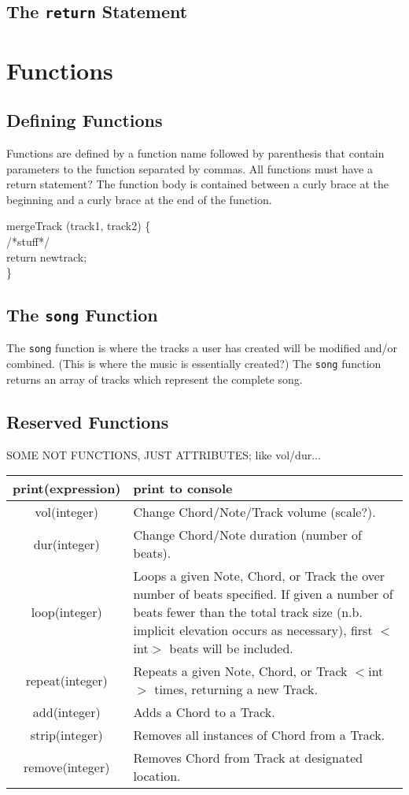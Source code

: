 \documentclass[letterpaper]{article}
\begin{document}
\subsection{The \texttt{return} Statement}
\section{Functions}
\subsection{Defining Functions}
Functions are defined by a function name followed by parenthesis that contain parameters to the function separated by commas. All functions must have a return statement? The function body is contained between a curly brace at the beginning and a curly brace at the end of the function.

mergeTrack (track1, track2) \{ \\
		/*stuff*/ \\
	return newtrack;\\
\}


\subsection{The \texttt{song} Function}
The \texttt{song} function is where the tracks a user has created will be modified and/or combined. (This is where the music is essentially created?) The \texttt{song} function returns an array of tracks which represent the complete song.

\begin{samepage}
\subsection{Reserved Functions}
\begin{table}[H]
\centering
SOME NOT FUNCTIONS, JUST ATTRIBUTES; like vol/dur...
\begin{tabularx}{.75\textwidth}{|c|X|}
\hline
print(expression) & print to console \\
\hline
vol(integer) & Change Chord/Note/Track volume (scale?). \\
\hline
dur(integer) & Change Chord/Note duration (number of beats). \\
\hline
loop(integer) & Loops a given Note, Chord, or Track the over number of beats specified. If given a number of beats fewer than the total track size (n.b. implicit elevation occurs as necessary), first $<$int$>$ beats will be included. \\
\hline
repeat(integer) & Repeats a given Note, Chord, or Track $<$int$>$ times, returning a new Track. \\
\hline
add(integer) & Adds a Chord to a Track. \\
\hline
strip(integer) & Removes all instances of Chord from a Track. \\
\hline
remove(integer) & Removes Chord from Track at designated location. \\
\hline
\end{tabularx}
\end{table}
\end{samepage}
\end{document}
